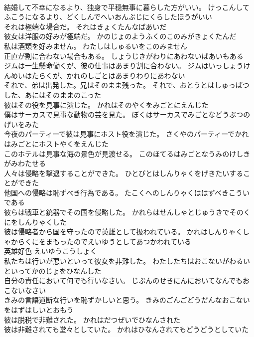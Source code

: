 \documentclass[8pt]{extreport}
\begin{document}
\begin{CJK}{UTF8}{min}
\\	結婚して不幸になるより、独身で平穏無事に暮らした方がいい。	けっこんしてふこうになるより、どくしんでへいおんぶじにくらしたほうがいい 
\\	それは極端な場合だ。	それはきょくたんなばあいだ 
\\	彼女は洋服の好みが極端だ。	かのじょのようふくのこのみがきょくたんだ 
\\	私は酒類を好みません。	わたしはしゅるいをこのみません 
\\	正直が割に合わない場合もある。	しょうじきがわりにあわないばあいもある 
\\	ジムは一生懸命働くが、彼の仕事はあまり割に合わない。	ジムはいっしょうけんめいはたらくが、かれのしごとはあまりわりにあわない 
\\	それで、弟は出発した。兄はそのまま残った。	それで、おとうとはしゅっぱつした、あにはそのままのこった 
\\	彼はその役を見事に演じた。	かれはそのやくをみごとにえんじた 
\\	僕はサーカスで見事な動物の芸を見た。	ぼくはサーカスでみごとなどうぶつのげいをみた 
\\	今夜のパーティーで彼は見事にホスト役を演じた。	さくやのパーティーでかれはみごとにホストやくをえんじた 
\\	このホテルは見事な海の景色が見渡せる。	このほてるはみごとなうみのけしきがみわたせる 
\\	人々は侵略を撃退することができた。	ひとびとはしんりゃくをげきたいすることができた 
\\	他国への侵略は恥ずべき行為である。	たこくへのしんりゃくははずべきこういである 
\\	彼らは戦車と銃器でその国を侵略した。	かれらはせんしゃとじゅうきでそのくにをしんりゃくした 
\\	彼は侵略者から国を守ったので英雄として扱われている。	かれはしんりゃくしゃからくにをまもったのでえいゆうとしてあつかわれている 
\\	英雄好色	えいゆうこうしょく 
\\	私たちは行いが悪いといって彼女を非難した。	わたしたちはおこないがわるいといってかのじょをひなんした 
\\	自分の責任において何でも行いなさい。	じぶんのせきにんにおいてなんでもおこないなさい 
\\	きみの言語道断な行いを恥ずかしいと思う。	きみのごんごどうだんなおこないをはずはしいとおもう 
\\	彼は脱税で非難された。	かれはだつぜいでひなんされた 
\\	彼は非難されても堂々としていた。	かれはひなんされてもどうどうとしていた 

\end{CJK}
\end{document}
